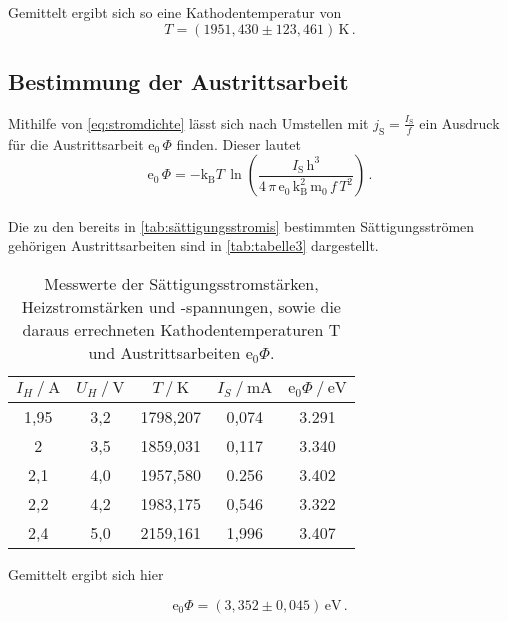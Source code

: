 Gemittelt ergibt sich so eine Kathodentemperatur von
\begin{equation*}
    T = (1951,430 \pm 123,461) \,\unit{\kelvin} \,.
\end{equation*}


\subsection{Bestimmung der Austrittsarbeit}

Mithilfe von \eqref{eq:stromdichte} lässt sich nach Umstellen mit $j_\text{S} = \frac{I_\text{S}}{f}$ ein Ausdruck für die Austrittsarbeit $\text{e}_0 \,\Phi$ finden.
Dieser lautet
\begin{equation*}
    \text{e}_0 \,\Phi = -\text{k}_\text{B} T \,\ln \left(\dfrac{I_\text{S} \, \text{h}^3}{4 \, \pi \, \text{e}_0 \, \text{k}^2_\text{B} \, \text{m}_0 \,f \,  T^2}\right) \,.
\end{equation*} \\

Die zu den bereits in \autoref{tab:sättigungsstromis} bestimmten Sättigungsströmen gehörigen Austrittsarbeiten sind in \autoref{tab:tabelle3} dargestellt.

%
%
%
%

\begin{table}[H]
    \centering
    \caption{Messwerte der Sättigungsstromstärken, Heizstromstärken und -spannungen, sowie die daraus errechneten Kathodentemperaturen T und Austrittsarbeiten $\text{e}_0\Phi$.}
    \label{tab:tabelle3}
    \begin{tabular}{S[table-format=1.2] S S S S}
        \toprule
        {$I_{H} \mathbin{/} \unit{\ampere}$} & {$U_{H} \mathbin{/} \unit{\volt}$} & {$T \mathbin{/} \unit{\kelvin}$} & {$I_{S} \mathbin{/} \unit{\milli\ampere}$} & {$\text{e}_0\Phi \mathbin{/} \unit{\eV}$} \\
        ,95&3,2&1798,207&0,074&3.291\\
        2   &3,5&1859,031&0,117&3.340\\
        2,1 &4,0&1957,580&0.256&3.402\\
        2,2 &4,2&1983,175&0,546&3.322\\
        2,4 &5,0&2159,161&1,996&3.407\\
        \bottomrule
    \end{tabular}
\end{table}



Gemittelt ergibt sich hier

\begin{equation*}
    \text{e}_0 \Phi = (3,352 \pm 0,045) \,\unit{\eV} \,.
\end{equation*}